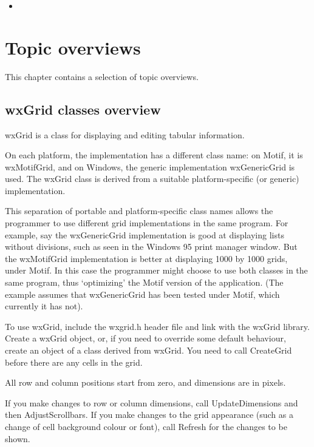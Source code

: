 \begin{itemize}\itemsep=0pt
\item {}
\end{itemize}

\chapter{Topic overviews}\label{overviews}

This chapter contains a selection of topic overviews.

\section{wxGrid classes overview}\label{gridoverview}

wxGrid is a class for displaying and editing tabular information.

On each platform, the implementation has a different class name: on Motif,
it is wxMotifGrid, and on Windows, the generic implementation wxGenericGrid
is used. The wxGrid class is derived from a suitable platform-specific
(or generic) implementation.

This separation of portable and platform-specific class names allows the
programmer to use different grid implementations in the same program.
For example, say the wxGenericGrid implementation is good at displaying
lists without divisions, such as seen in the Windows 95 print manager
window. But the wxMotifGrid implementation is better at displaying 1000
by 1000 grids, under Motif. In this case the programmer might choose to
use both classes in the same program, thus `optimizing' the Motif
version of the application. (The example assumes that wxGenericGrid has
been tested under Motif, which currently it has not).

To use wxGrid, include the wxgrid.h header file and link with the
wxGrid library. Create a wxGrid object, or, if you need to override
some default behaviour, create an object of a class derived from wxGrid.
You need to call CreateGrid before there are any cells in the grid.

All row and column positions start from zero, and dimensions are in pixels.

If you make changes to row or column dimensions, call UpdateDimensions and
then AdjustScrollbars. If you make changes to the grid appearance (such as
a change of cell background colour or font), call Refresh for the changes
to be shown.

